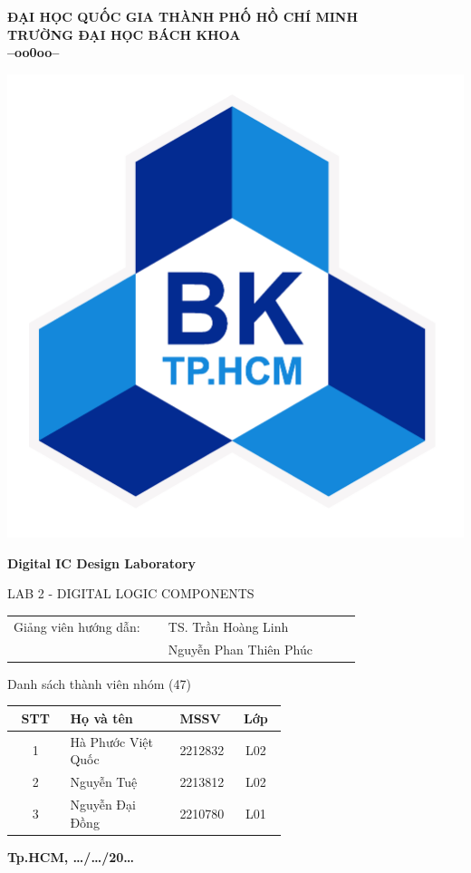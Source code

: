\BgThispage
\thispagestyle{empty}
\begin{center}
	\Large\textbf{ĐẠI HỌC QUỐC GIA THÀNH PHỐ HỒ CHÍ MINH \\ TRƯỜNG ĐẠI HỌC BÁCH KHOA\\--oo0oo--}
\end{center}
\vspace{0.5cm}
\begin{center}
	\includegraphics[width=0.3\linewidth]{section/pic/01_logobachkhoatoi.png}
\end{center}
\vspace{0.4cm}
\begin{center}
	\LARGE\textbf{Digital IC Design Laboratory}
	\vspace{0.1cm}
	
	\Large{LAB 2 - DIGITAL LOGIC COMPONENTS}
\end{center}
\vspace{1cm}

\LARGE

\hspace{2cm}\begin{tabular}{p{0.4\linewidth} p{0.5\linewidth}}
	Giảng viên hướng dẫn: & TS. Trần Hoàng Linh \\
						  & Nguyễn Phan Thiên Phúc \\
\end{tabular}

\vspace{0.5cm}
\begin{center}
	Danh sách thành viên nhóm (47)
	
	\begin{tabular}{|c|p{0.4\linewidth}|p{0.2\linewidth}| c |}
		\hline
		STT & Họ và tên & MSSV & Lớp\\
		\hline
		1 & Hà Phước Việt Quốc & 2212832 & L02\\
		\hline
		2 & Nguyễn Tuệ & 2213812 & L02\\
		\hline
		3 & Nguyễn Đại Đồng & 2210780 & L01\\
		\hline
	\end{tabular}
\end{center}

\vspace{1cm}
\begin{center}
	\fontsize{8pt}{5pt}\selectfont\textbf{Tp.HCM, \dots/\dots/20\dots}
\end{center}

\newpage
\thispagestyle{empty}
\fontsize{13}{14}\selectfont
\tableofcontents
\listoffigures